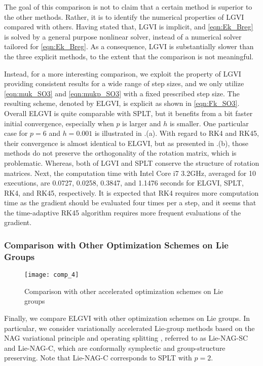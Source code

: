 \documentclass[letterpaper, 10pt, conference]{ieeeconf}
\begin{document}
The goal of this comparison is not to claim that a certain method is superior to the other methods.
Rather, it is to identify the numerical properties of LGVI compared with others. 
Having stated that, LGVI is implicit, and \eqref{eqn:Ek_Breg} is solved by a general purpose nonlinear solver, instead of a numerical solver tailored for \eqref{eqn:Ek_Breg}.
As a consequence, LGVI is substantially slower than the three explicit methods, to the extent that the comparison is not meaningful. 

Instead, for a more interesting comparison, we exploit the property of LGVI providing consistent results for a wide range of step sizes, and we only utilize \eqref{eqn:muk_SO3} and \eqref{eqn:mukp_SO3} with a fixed prescribed step size. 
The resulting scheme, denoted by ELGVI, is explicit as shown in \eqref{eqn:Fk_SO3}.
Overall ELGVI is quite comparable with SPLT, but it benefits from a bit faster initial convergence, especially when $p$ is larger and $h$ is smaller. 
One particular case for $p=6$ and $h=0.001$ is illustrated in .(a).
With regard to RK4 and RK45, their convergence is almost identical to ELGVI, but as presented in .(b), those methods do not preserve the orthogonality of the rotation matrix, which is problematic.  
Whereas, both of LGVI and SPLT conserve the structure of rotation matrices. 
Next, the computation time with Intel Core i7 3.2GHz, averaged for 10 executions, are 0.0727, 0.0258, 0.3847, and 1.1476 seconds for ELGVI, SPLT, RK4, and RK45, respectively. 
It is expected that RK4 requires more computation time as the gradient should be evaluated four times per a step, and it seems that the time-adaptive RK45 algorithm requires more frequent evaluations of the gradient. 

\subsubsection{Comparison with Other Optimization Schemes on Lie Groups}

\begin{figure}
    \centerline{
        \texttt{[image: comp\_4]}
    }
    \caption{Comparison with other accelerated optimization schemes on Lie groups}\label{fig:comp_accel}
\end{figure}

Finally, we compare ELGVI with other optimization schemes on Lie groups. 
In particular, we consider variationally accelerated Lie-group methods based on the NAG variational principle and operating splitting \cite{tao2020variational},  referred to as Lie-NAG-SC and Lie-NAG-C, which are conformally symplectic and group-structure preserving. Note that Lie-NAG-C corresponds to SPLT with $p=2$. %
\end{document}
